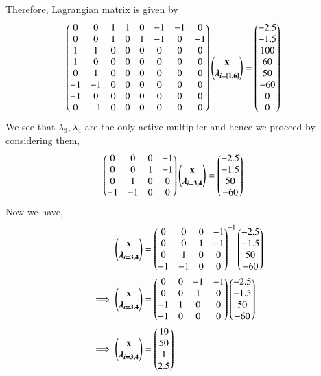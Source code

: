 \documentclass[journal,12pt,twocolumn]{IEEEtran}
\begin{document}
Therefore, Lagrangian matrix is given by
\begin{align}
    \begin{pmatrix}0 & 0 & 1 & 1 & 0 & -1 & -1 & 0 \\ 0 & 0 & 1 & 0 & 1 & -1 & 0 & -1 \\ 1 & 1 & 0 & 0 & 0 & 0 & 0 & 0 \\ 1 & 0 & 0 & 0 & 0 & 0 & 0 & 0 \\ 0 & 1 & 0 & 0 & 0 & 0 & 0 & 0 \\ -1 & -1 & 0 & 0 & 0 & 0 & 0 & 0 \\ -1 & 0 & 0 & 0 & 0 & 0 & 0 & 0 \\ 0 & -1 & 0 & 0 & 0 & 0 & 0 & 0 \end{pmatrix}\begin{pmatrix}\mathbf{x} \\ \boldsymbol{\lambda_{i=[1,6]}}\end{pmatrix} &= \begin{pmatrix}-2.5 \\ -1.5 \\ 100 \\ 60 \\ 50 \\ -60 \\0 \\ 0 \end{pmatrix}
\end{align}
We see that $\lambda_3,\lambda_4$ are the only active multiplier and hence we proceed by considering them,
\begin{align}
    \begin{pmatrix}0 & 0 & 0 & -1 \\ 0 & 0 & 1 & -1 \\ 0 & 1 & 0 & 0 \\ -1 & -1 & 0 & 0\end{pmatrix}\begin{pmatrix}\mathbf{x}\\ \boldsymbol{\lambda_{i=3,4}}\end{pmatrix} &= \begin{pmatrix}-2.5 \\ -1.5 \\ 50 \\ -60\end{pmatrix}
\end{align}
Now we have,
\begin{align}
    \begin{pmatrix}\mathbf{x} \\ \boldsymbol{\lambda_{i=3,4}}\end{pmatrix} &= \begin{pmatrix}0 & 0 & 0 & -1 \\ 0 & 0 & 1 & -1 \\ 0 & 1 & 0 & 0 \\ -1 & -1 & 0 & 0\end{pmatrix}^{-1}\begin{pmatrix}-2.5 \\ -1.5 \\ 50 \\ -60\end{pmatrix}
    \\
    \implies   \begin{pmatrix}\mathbf{x} \\ \boldsymbol{\lambda_{i=3,4}}\end{pmatrix} &= \begin{pmatrix}0 & 0 & -1 & -1 \\ 0 & 0 & 1 & 0 \\ -1 & 1 & 0 & 0 \\ -1 & 0 & 0 & 0\end{pmatrix}\begin{pmatrix}-2.5 \\ -1.5 \\ 50 \\ -60\end{pmatrix}
    \\
    \implies \begin{pmatrix}\mathbf{x} \\ \boldsymbol{\lambda_{i=3,4}}\end{pmatrix} &= \begin{pmatrix}10 \\ 50 \\ 1 \\ 2.5\end{pmatrix}
\end{align}
\end{document}
